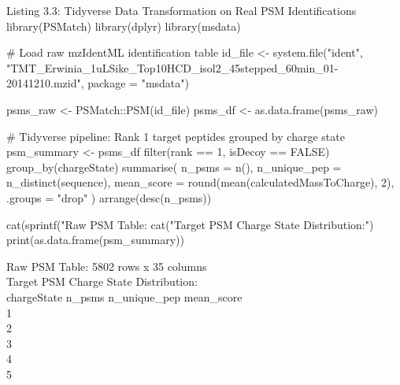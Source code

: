 \documentclass[11pt,twoside,openright]{book}
\begin{document}
\begin{rchunk}{Listing 3.3: Tidyverse Data Transformation on Real PSM Identifications}
library(PSMatch)
library(dplyr)
library(msdata)

# Load raw mzIdentML identification table
id_file <- system.file("ident",
  "TMT_Erwinia_1uLSike_Top10HCD_isol2_45stepped_60min_01-20141210.mzid",
  package = "msdata")

psms_raw <- PSMatch::PSM(id_file)
psms_df  <- as.data.frame(psms_raw)

# Tidyverse pipeline: Rank 1 target peptides grouped by charge state
psm_summary <- psms_df %
  filter(rank == 1, isDecoy == FALSE) %
  group_by(chargeState) %
  summarise(
    n_psms       = n(),
    n_unique_pep = n_distinct(sequence),
    mean_score   = round(mean(calculatedMassToCharge), 2),
    .groups      = "drop"
  ) %
  arrange(desc(n_psms))

cat(sprintf("Raw PSM Table: %
cat("Target PSM Charge State Distribution:\n")
print(as.data.frame(psm_summary))
\end{rchunk}

\begin{routput}
Raw PSM Table: 5802 rows x 35 columns\\
Target PSM Charge State Distribution:\\
\enspace\enspace chargeState n\_psms n\_unique\_pep mean\_score\\
1\enspace\enspace\enspace\enspace\enspace\enspace\enspace\enspace\enspace{}\enspace{}\enspace\enspace\enspace\enspace\enspace\enspace{}\enspace\enspace\enspace{}\\
2\enspace\enspace\enspace\enspace\enspace\enspace\enspace\enspace\enspace{}\enspace\enspace{}\enspace\enspace\enspace\enspace\enspace\enspace\enspace{}\enspace\enspace\enspace{}\\
3\enspace\enspace\enspace\enspace\enspace\enspace\enspace\enspace\enspace{}\enspace\enspace{}\enspace\enspace\enspace\enspace\enspace\enspace\enspace{}\enspace\enspace\enspace{}\\
4\enspace\enspace\enspace\enspace\enspace\enspace\enspace\enspace\enspace{}\enspace\enspace\enspace{}\enspace\enspace\enspace\enspace\enspace\enspace\enspace\enspace{}\enspace\enspace\enspace{}\\
5\enspace\enspace\enspace\enspace\enspace\enspace\enspace\enspace\enspace{}\enspace\enspace\enspace\enspace{}\enspace\enspace\enspace\enspace\enspace\enspace\enspace\enspace\enspace{}\enspace\enspace\enspace{}
\end{routput}
\end{document}
